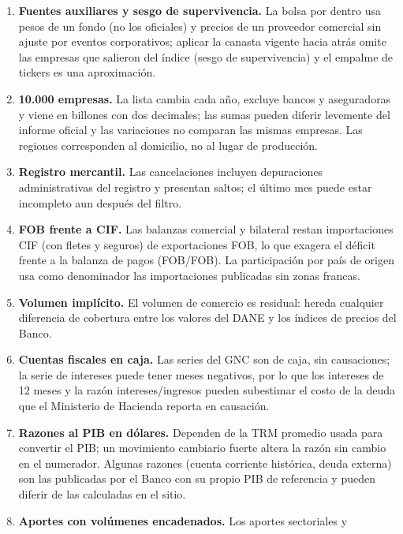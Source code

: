 \begin{enumerate}
  \textbf{Índice de precios frente a retorno total.} El COLCAP y los
  índices equiponderado y de 7 Magníficas son índices de precios, sin
  dividendos; no miden el retorno total del inversionista.
\item
  \textbf{Fuentes auxiliares y sesgo de supervivencia.} La bolsa por
  dentro usa pesos de un fondo (no los oficiales) y precios de un
  proveedor comercial sin ajuste por eventos corporativos; aplicar la
  canasta vigente hacia atrás omite las empresas que salieron del índice
  (sesgo de supervivencia) y el empalme de tickers es una aproximación.
\item
  \textbf{10.000 empresas.} La lista cambia cada año, excluye bancos y
  aseguradoras y viene en billones con dos decimales; las sumas pueden
  diferir levemente del informe oficial y las variaciones no comparan
  las mismas empresas. Las regiones corresponden al domicilio, no al
  lugar de producción.
\item
  \textbf{Registro mercantil.} Las cancelaciones incluyen depuraciones
  administrativas del registro y presentan saltos; el último mes puede
  estar incompleto aun después del filtro.
\item
  \textbf{FOB frente a CIF.} Las balanzas comercial y bilateral restan
  importaciones CIF (con fletes y seguros) de exportaciones FOB, lo que
  exagera el déficit frente a la balanza de pagos (FOB/FOB). La
  participación por país de origen usa como denominador las
  importaciones publicadas sin zonas francas.
\item
  \textbf{Volumen implícito.} El volumen de comercio es residual: hereda
  cualquier diferencia de cobertura entre los valores del DANE y los
  índices de precios del Banco.
\item
  \textbf{Cuentas fiscales en caja.} Las series del GNC son de caja, sin
  causaciones; la serie de intereses puede tener meses negativos, por lo
  que los intereses de 12 meses y la razón intereses/ingresos pueden
  subestimar el costo de la deuda que el Ministerio de Hacienda reporta
  en causación.
\item
  \textbf{Razones al PIB en dólares.} Dependen de la TRM promedio usada
  para convertir el PIB; un movimiento cambiario fuerte altera la razón
  sin cambio en el numerador. Algunas razones (cuenta corriente
  histórica, deuda externa) son las publicadas por el Banco con su
  propio PIB de referencia y pueden diferir de las calculadas en el
  sitio.
\item
  \textbf{Aportes con volúmenes encadenados.} Los aportes sectoriales y

\end{enumerate}
